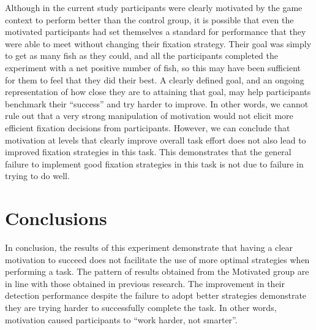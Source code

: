 \documentclass[vision,article,submit,moreauthors,pdftex,10pt,a4paper]{mdpi}
\begin{document}
Although in the current study participants were clearly motivated by the game context to perform better than the control group, it is possible that even the motivated participants had set themselves a standard for performance that they were able to meet without changing their fixation strategy. Their goal was simply to get as many fish as they could, and all the participants completed the experiment with a net positive number of fish, so this may have been sufficient for them to feel that they did their best. A clearly defined goal, and an ongoing representation of how close they are to attaining that goal, may help participants benchmark their “success” and try harder to improve. In other words, we cannot rule out that a very strong manipulation of motivation would not elicit more efficient fixation decisions from participants. However, we can conclude that motivation at levels that clearly improve overall task effort does not also lead to improved fixation strategies in this task. This demonstrates that the general failure to implement good fixation strategies in this task is not due to failure in trying to do well.



\section{Conclusions}
In conclusion, the results of this experiment demonstrate that having a clear motivation to succeed does not facilitate the use of more optimal strategies when performing a task. The pattern of results obtained from the Motivated group are in line with those obtained in previous research. The improvement in their detection performance despite the failure to adopt better strategies demonstrate they are trying harder to successfully complete the task. In other words, motivation caused participants to “work harder, not smarter”.
 


\end{document}
